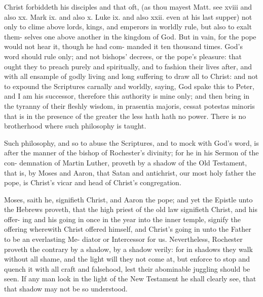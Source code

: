 \documentclass{custom}
\begin{document}
Christ forbiddeth his disciples and that oft, (as thou mayest 
Matt. see xviii and also xx. Mark ix. and also x. Luke ix. and 
also xxii. even at his last supper) not only to clime above lords, 
kings, and emperors in worldly rule, but also to exalt them- 
selves one above another in the kingdom of God. But in 
vain, for the pope would not hear it, though he had com-
manded it ten thousand times. God's word should rule
only; and not bishops' decrees, or the pope's pleasure: that
ought they to preach purely and spiritually, and to fashion 
their lives after, and with all ensample of godly living and 
long suffering to draw all to Christ: and not to expound 
the Scriptures carnally and worldly, saying, God spake this 
to Peter, and I am his successor, therefore this authority 
is mine only; and then bring in the tyranny of their fleshly 
wisdom, in prasentia majoris, cessat potestas minoris that is
in the presence of the greater the less hath hath no power.
There is no brotherhood where such philosophy is taught. 

Such philosophy, and so to abuse the Scriptures, and to
mock with God's word, is after the manner of the bishop 
of Rochester's divinity; for he in his Sermon of the con- 
demnation of Martin Luther, proveth by a shadow of the 
Old Testament, that is, by Moses and Aaron, that Satan 
and antichrist, our most holy father the pope, is Christ's 
vicar and head of Christ's congregation. 

Moses, saith he, signifieth Christ, and Aaron the pope; 
and yet the Epistle unto the Hebrews proveth, that the 
high priest of the old law signifieth Christ, and his offer- 
ing and his going in once in the year into the inner temple, 
signify the offering wherewith Christ offered himself, and 
Christ's going in unto the Father to be an everlasting Me- 
diator or Intercessor for us. Nevertheless, Rochester 
proveth the contrary by a shadow, by a shadow verily: for 
in shadows they walk without all shame, and the light will 
they not come at, but enforce to stop and quench it with 
all craft and falsehood, lest their abominable juggling 
should be seen. If any man look in the light of the New 
Testament he shall clearly see, that that shadow may not
be so understood.
\end{document}
